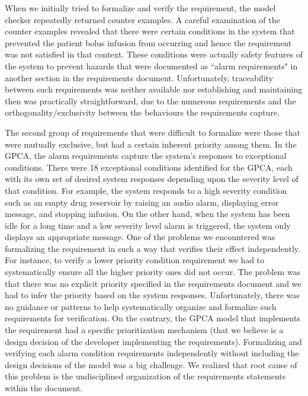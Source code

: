 When we initially tried to formalize and verify the requirement, the model checker repeatedly returned counter examples. A careful examination of the counter examples revealed that there were certain conditions in the system that prevented the patient bolus infusion from occurring and hence the requirement was not satisfied in that context. These conditions were actually safety features of the system to prevent hazards that were documented as ``alarm requirements" in another section in the requirements document.  Unfortunately, traceability between such requirements was neither available nor establishing and maintaining then was practically straightforward, due to the numerous requirements and the orthogonality/exclusivity between the behaviours the requirements capture.

The second group of requirements that were difficult to formalize were those that were mutually exclusive, but had a certain inherent priority among them. In the GPCA, the alarm requirements capture the system's responses to exceptional conditions. There were 18 exceptional conditions identified for the GPCA, each with its own set of desired system responses depending upon the severity level of that condition. For example, the system responds to a high severity condition such as an empty drug reservoir by raising an audio alarm, displaying error message, and stopping infusion. On the other hand, when the system has been idle for a long time and a low severity level alarm is triggered, the system only displays an appropriate message. One of the problems we encountered was formalizing the requirement in such a way that verifies their effect independently. For instance, to verify a lower priority condition requirement we had to systematically ensure all the higher priority ones did not occur. The problem was that there was no explicit priority specified in the requirements document and we had to infer the priority based on the system responses. Unfortunately, there was no guidance or patterns to help systematically organize and formalize such requirements for verification. On the contrary, the GPCA model that implements the requirement had a specific prioritization mechanism (that we believe is a design decision of the developer implementing the requirements). Formalizing and verifying each alarm condition requirements independently without including the design decisions of the model was a big challenge. We realized that root cause of this problem is the undisciplined organization of the requirements statements within the document.
